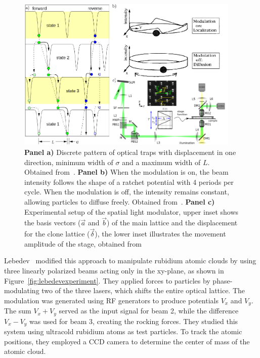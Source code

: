 \begin{figure}
  \begin{center}
    \includegraphics[width=0.95\textwidth]{figures/rockingratchets.pdf}
  \end{center}
  \caption[Rocking ratchets expermients.]{\textbf{Panel a)} Discrete pattern of optical traps with displacement in one direction, minimum width of $\sigma$ and a maximum width of $L$. Obtained from~\cite{lee2005observation}. \textbf{Panel b)} When the modulation is on, the beam intensity follows the shape of a ratchet potential with 4 periods per cycle. When the modulation is off, the intensity remains constant, allowing particles to diffuse freely. Obtained from~\cite{faucheux1995optical}. \textbf{Panel c)} Experimental setup of the spatial light modulator, upper inset shows the basis vectors ($\vec{a}$ and $\vec{b}$) of the main lattice and the displacement for the clone lattice ($\vec{\delta}$), the lower inset illustrates the movement amplitude of the stage, obtained from~\cite{arzola2017omnidirectional}}\label{fig:rockingratchets}
\end{figure}

 Lebedev~\cite{lebedev2009two} modified this approach to manipulate rubidium atomic clouds by using three linearly polarized beams acting only in the xy-plane, as shown in Figure~\ref{fig:lebedevexperiment}. They applied forces to particles by phase-modulating two of the three lasers, which shifts the entire optical lattice. The modulation was generated using RF generators to produce potentials $V_x$ and $V_y$. The sum $V_x + V_y$ served as the input signal for beam 2, while the difference $V_x - V_y$ was used for beam 3, creating the rocking forces. They studied this system using ultracold rubidium atoms as test particles. To track the atomic positions, they employed a CCD camera to determine the center of mass of the atomic cloud.


